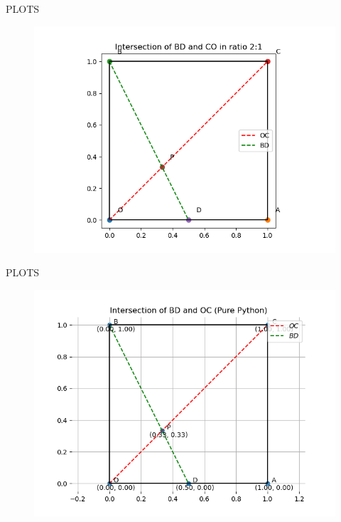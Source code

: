 \documentclass{beamer}
\begin{document}
\begin{frame}[fragile]{PLOTS}
\begin{figure}
    \centering
    \includegraphics[width=0.9\columnwidth]{figs/fig51.png}
    \caption{}
    \label{fig:placeholder}
\end{figure}
\end{frame}
\begin{frame}[fragile]{PLOTS}
\begin{figure}
    \centering
    \includegraphics[width=0.9\columnwidth]{figs/fig52.png}
    \caption{}
    \label{fig:placeholder}
\end{figure}
\end{frame}
\end{document}
